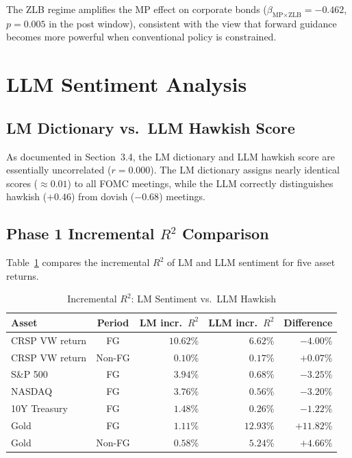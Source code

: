 \documentclass[11pt,a4paper]{article}
\begin{document}
The ZLB regime amplifies the MP effect on corporate bonds ($\beta_{\text{MP}\times\text{ZLB}} = -0.462$, $p = 0.005$ in the post window), consistent with the view that forward guidance becomes more powerful when conventional policy is constrained.

\section{LLM Sentiment Analysis}
\label{sec:llm}

\subsection{LM Dictionary vs.\ LLM Hawkish Score}

As documented in Section~3.4, the LM dictionary and LLM hawkish score are essentially uncorrelated ($r = 0.000$). The LM dictionary assigns nearly identical scores ($\approx 0.01$) to all FOMC meetings, while the LLM correctly distinguishes hawkish ($+0.46$) from dovish ($-0.68$) meetings.

\subsection{Phase 1 Incremental $R^2$ Comparison}

Table~\ref{tab:incr_r2} compares the incremental $R^2$ of LM and LLM sentiment for five asset returns.

\begin{table}[H]
\centering
\caption{Incremental $R^2$: LM Sentiment vs.\ LLM Hawkish}
\label{tab:incr_r2}
\begin{tabular}{lcrrr}
\toprule
Asset & Period & LM incr.\ $R^2$ & LLM incr.\ $R^2$ & Difference \\
\midrule
CRSP VW return & FG & $10.62\%$ & $6.62\%$ & $-4.00\%$ \\
CRSP VW return & Non-FG & $0.10\%$ & $0.17\%$ & $+0.07\%$ \\
S\&P 500 & FG & $3.94\%$ & $0.68\%$ & $-3.25\%$ \\
NASDAQ & FG & $3.76\%$ & $0.56\%$ & $-3.20\%$ \\
10Y Treasury & FG & $1.48\%$ & $0.26\%$ & $-1.22\%$ \\
Gold & FG & $1.11\%$ & $12.93\%$ & $+11.82\%$ \\
Gold & Non-FG & $0.58\%$ & $5.24\%$ & $+4.66\%$ \\
\bottomrule
\end{tabular}
\end{table}
\end{document}
